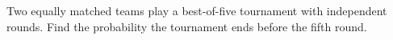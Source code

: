 Two equally matched teams play a best-of-five tournament with independent rounds. Find the probability the tournament ends before the fifth round.
